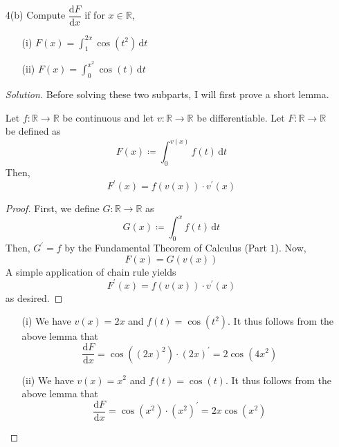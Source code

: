 \documentclass[12pt]{article}
\def\D{\mathrm{d}}
\theoremstyle{definition}
\newenvironment{soln}{\begin{proof}[Solution]}{\end{proof}}
\begin{document}
\begin{enumerate}[leftmargin=*]
    \newpage
    
    \item[4(b)] Compute $\dfrac{\D F}{\D x}$ if for $x \in \mathbb{R}$, 
    \begin{multicols}{2}
    \begin{enumerate}[leftmargin=*]
        \item[(i)] $F(x) = \displaystyle\int_1^{2x} \cos\left( t^2 \right) \, \D t$
        \item[(ii)] $F(x) = \displaystyle\int_0^{x^2} \cos(t) \, \D t$
    \end{enumerate}
    \end{multicols}
    
    \begin{soln}
        Before solving these two subparts, I will first prove a short lemma. 
        \begin{lem*}
            Let $f \colon \mathbb{R} \to \mathbb{R}$ be continuous and let $v \colon \mathbb{R} \to \mathbb{R}$ be differentiable. Let $F \colon \mathbb{R} \to \mathbb{R}$ be defined as
            \[
                F(x) \coloneqq \int_{0}^{v(x)} f(t) \, \D t
            \]
            Then, 
            \[
                F^{\prime}(x) = f\left( v(x) \right) \cdot v^{\prime}(x)
            \]
        \end{lem*}
        
        \begin{proof}
            First, we define $G \colon \mathbb{R} \to \mathbb{R}$ as 
            \[
                G(x) \coloneqq \int_0^x f(t) \, \D t
            \]
            Then, $G^{\prime} = f$ by the Fundamental Theorem of Calculus (Part $1$). Now,
            \[
                F(x) = G\left( v(x) \right)
            \]
            A simple application of chain rule yields
            \[
                F^{\prime}(x) = f\left( v(x) \right) \cdot v^{\prime}(x)
            \]
            as desired.
        \end{proof}
        
        \begin{enumerate}[leftmargin=*]
            \item[(i)] We have $v(x) = 2x$ and $f(t) = \cos(t^2)$. It thus follows from the above lemma that
            \[
                \frac{\D F}{\D x} = \cos \left( (2x)^2 \right) \cdot \left( 2x \right)^{\prime} = \boxed{2\cos\left( 4x^2 \right)}
            \]
            \item[(ii)] We have $v(x) = x^2$ and $f(t) = \cos(t)$. It thus follows from the above lemma that
            \[
                \frac{\D F}{\D x} = \cos \left( x^2 \right) \cdot \left( x^2 \right)^{\prime}= \boxed{2x \cos\left( x^2 \right)}
            \]
        \end{enumerate}
    \end{soln}
    

\end{enumerate}
\end{document}

